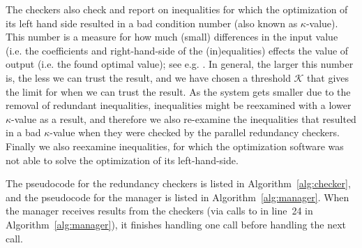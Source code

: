 The checkers also check and report on inequalities for which the optimization of its left hand side resulted in a bad condition number (also known as $\kappa$-value). This number is a measure for how much (small) differences in the input value (i.e. the coefficients and right-hand-side of the (in)equalities) effects the value of output (i.e. the found optimal value); see {e.g. \cite{numAnalysis}}. In general, the larger this number is, the less we can trust the result, and we have chosen a threshold $\mathcal{K}$ that gives the limit for when we can trust the result. As the system gets smaller due to the removal of redundant inequalities, inequalities might be reexamined with a lower $\kappa$-value as a result, and therefore we also re-examine the inequalities that resulted in a bad $\kappa$-value when they were checked by the parallel redundancy checkers. 
Finally we also reexamine inequalities, for which the optimization software was not able to solve the optimization of its left-hand-side.

The pseudocode for the redundancy checkers is listed in Algorithm~\ref{alg:checker}, and the pseudocode for the manager is listed in Algorithm~\ref{alg:manager}. 
When the manager receives results from the checkers (via calls to  in line~24 in Algorithm~\ref{alg:manager}), it finishes handling one call before handling the next call. %

